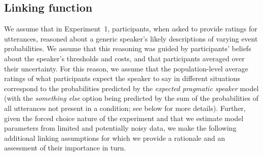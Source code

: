\documentclass[man, floatsintext]{apa6}
\begin{document}



\subsection{Linking function}

We assume that in Experiment~1, participants, when asked to provide ratings for utterances, reasoned about a generic speaker's 
likely descriptions of varying event probabilities. 
We assume that this reasoning was guided by participants' beliefs about the speaker's thresholds and costs, and 
that participants averaged over their uncertainty. For this reason, we assume that the population-level 
average ratings of what participants expect the speaker to say in different situations 
correspond to the probabilities predicted by the \textit{expected pragmatic speaker} model (with the \textit{something else}
option being predicted by the sum of the probabilities of all utterances not present in a condition; see below for more details).
Further, given the forced choice nature of the experiment and that we estimate model 
parameters from limited and potentially noisy data, we make the following additional linking assumptions
for which we provide a rationale and an assessment of their importance in turn.
\end{document}
